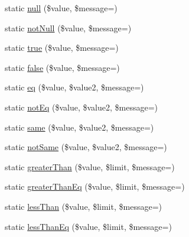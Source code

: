 \begin{DoxyCompactItemize}
\item 
static \mbox{\hyperlink{class_webmozart_1_1_assert_1_1_assert_a3d8250bbe96b8687a49996b434805f6e}{null}} (\$value, \$message=\textquotesingle{}\textquotesingle{})
\item 
static \mbox{\hyperlink{class_webmozart_1_1_assert_1_1_assert_a9e3fc27f3f225919bd3c27bf3e88313c}{not\+Null}} (\$value, \$message=\textquotesingle{}\textquotesingle{})
\item 
static \mbox{\hyperlink{class_webmozart_1_1_assert_1_1_assert_ac957dbcba5f3e95a18b7794fa790f8bd}{true}} (\$value, \$message=\textquotesingle{}\textquotesingle{})
\item 
static \mbox{\hyperlink{class_webmozart_1_1_assert_1_1_assert_a04dfee1f757ca120514a7266c198631b}{false}} (\$value, \$message=\textquotesingle{}\textquotesingle{})
\item 
static \mbox{\hyperlink{class_webmozart_1_1_assert_1_1_assert_a0420ed057ea989a212d47475c348a8bf}{eq}} (\$value, \$value2, \$message=\textquotesingle{}\textquotesingle{})
\item 
static \mbox{\hyperlink{class_webmozart_1_1_assert_1_1_assert_a69e0e337909fd57f13e434f1a09677d8}{not\+Eq}} (\$value, \$value2, \$message=\textquotesingle{}\textquotesingle{})
\item 
static \mbox{\hyperlink{class_webmozart_1_1_assert_1_1_assert_af17e96548128a8b70212816871fb6eca}{same}} (\$value, \$value2, \$message=\textquotesingle{}\textquotesingle{})
\item 
static \mbox{\hyperlink{class_webmozart_1_1_assert_1_1_assert_a2ce72631bf09eb424808e9aa4d619f9a}{not\+Same}} (\$value, \$value2, \$message=\textquotesingle{}\textquotesingle{})
\item 
static \mbox{\hyperlink{class_webmozart_1_1_assert_1_1_assert_a455d39d66e7b0e3869a098e0d2c20eae}{greater\+Than}} (\$value, \$limit, \$message=\textquotesingle{}\textquotesingle{})
\item 
static \mbox{\hyperlink{class_webmozart_1_1_assert_1_1_assert_aae21d9eba0466ce67cae1b9bbb8e394c}{greater\+Than\+Eq}} (\$value, \$limit, \$message=\textquotesingle{}\textquotesingle{})
\item 
static \mbox{\hyperlink{class_webmozart_1_1_assert_1_1_assert_a08dd4e121f4e4468a66da8529ab01f80}{less\+Than}} (\$value, \$limit, \$message=\textquotesingle{}\textquotesingle{})
\item 
static \mbox{\hyperlink{class_webmozart_1_1_assert_1_1_assert_a0aa69c0ba0338b37c15b441fe5d830cb}{less\+Than\+Eq}} (\$value, \$limit, \$message=\textquotesingle{}\textquotesingle{})

\end{DoxyCompactItemize}
